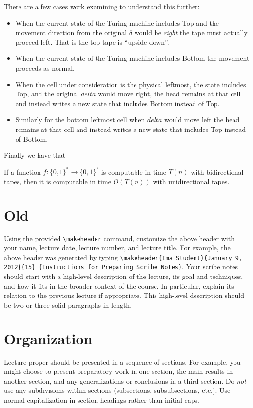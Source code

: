 \documentclass[usletter]{article}
\begin{document}
There are a few cases work examining to understand this further:

\begin{itemize}
  \item When the current state of the Turing machine includes Top and the movement direction from the original $\delta$ would be \textit{right} the tape must actually proceed left. That is the top tape is ``upside-down''.
  \item When the current state of the Turing machine includes Bottom the movement proceeds as normal.
  \item When the cell under consideration is the physical leftmost, the state includes Top, and the original $delta$ would move right, the head remains at that cell and instead writes a new state that includes Bottom instead of Top.
  \item Similarly for the bottom leftmost cell when $delta$ would move left the head remains at  that cell and instead writes a new state that includes Top instead of Bottom.
\end{itemize}

Finally we have that

\begin{theorem}
  If a function $f:\{0,1\}^* \rightarrow \{0,1\}^*$ is computable in time $T(n)$ with bidirectional tapes, then it is computable in time $O(T(n))$ with unidirectional tapes.
\end{theorem}

\newpage

\section{Old}

Using the provided \verb|\makeheader| command,
customize the above header with your name,
lecture date, lecture number, and lecture title. For
example, the above header was generated by typing
\verb|\makeheader{Ima Student}{January 9, 2012}{15}|{\tt
\{Instructions for Preparing Scribe Notes\}}.  Your
scribe notes should start with a high-level description
of the lecture, its goal and techniques, and how it
fits in the broader context of the course. In
particular, explain its relation to the previous
lecture if appropriate.  This high-level description
should be two or three solid paragraphs in length.

\section{Organization}
Lecture proper should be presented in a sequence of
sections. For example, you might choose to present
preparatory work in one section, the main results in
another section, and any generalizations or conclusions
in a third section. Do \emph{not} use any subdivisions
within sections (subsections, subsubsections, etc.).
Use normal capitalization in section headings rather
than initial caps.
\end{document}
